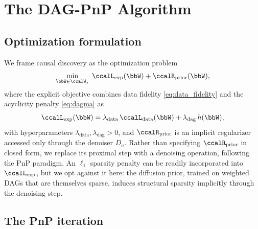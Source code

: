 \documentclass[conference]{IEEEtran}
\newcommand{\Ldata}{\ccalL_{\mathrm{data}}}
\newcommand{\Lext}{\ccalL_{\mathrm{exp}}}
\newcommand{\Rprior}{\ccalR_{\mathrm{prior}}}
\begin{document}
	\section{The DAG-PnP Algorithm}
	\label{sec:algorithm}
	
	\subsection{Optimization formulation}
	
	We frame causal discovery as the optimization problem
	\begin{equation}\label{eq:opt}
		\min_{\bbW \in \ccalW_s} \; \Lext(\bbW) + \Rprior(\bbW),
	\end{equation}
	where the explicit objective combines data fidelity \eqref{eq:data_fidelity} and the acyclicity penalty \eqref{eq:dagma} as
	\begin{equation}\label{eq:Lext}
		\Lext(\bbW) = \lambda_{\mathrm{data}} \, \Ldata(\bbW) + \lambda_{\mathrm{dag}} \, h(\bbW),
	\end{equation}
	with hyperparameters $\lambda_{\mathrm{data}}, \lambda_{\mathrm{dag}} > 0$, and $\Rprior$ is an implicit regularizer accessed only through the denoiser $D_\sigma$. Rather than specifying $\Rprior$ in closed form, we replace its proximal step with a denoising operation, following the PnP paradigm. An $\ell_1$ sparsity penalty can be readily incorporated into $\Lext$, but we opt against it here: the diffusion prior, trained on weighted DAGs that are themselves sparse, induces structural sparsity implicitly through the denoising step.
    
	\subsection{The PnP iteration}
	
\end{document}
